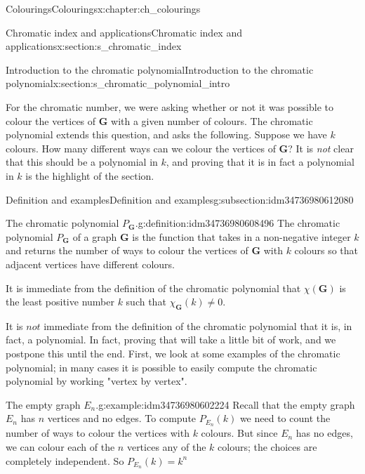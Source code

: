\documentclass[oneside,10pt,]{book}
\numberwithin{equation}{section}
\newcommand{\bfG}{\mathbf{G}}
\begin{document}
\begin{chapterptx}{Colourings}{}{Colourings}{}{}{x:chapter:ch_colourings}
\begin{sectionptx}{Chromatic index and applications}{}{Chromatic index and applications}{}{}{x:section:s_chromatic_index}
\end{sectionptx}
%
%
\typeout{************************************************}
\typeout{************************************************}
%
\begin{sectionptx}{Introduction to the chromatic polynomial}{}{Introduction to the chromatic polynomial}{}{}{x:section:s_chromatic_polynomial_intro}
\begin{introduction}{}%
For the chromatic number, we were asking whether or not it was possible to colour the vertices of \(\bfG\) with a given number of colours.  The chromatic polynomial extends this question, and asks the following.  Suppose we have \(k\) colours.  How many different ways can we colour the vertices of \(\bfG\)?  It is \emph{not} clear that this should be a polynomial in \(k\), and proving that it is in fact a polynomial in \(k\) is the highlight of the section.%
\end{introduction}%
%
%
\typeout{************************************************}
\typeout{************************************************}
%
\begin{subsectionptx}{Definition and examples}{}{Definition and examples}{}{}{g:subsection:idm34736980612080}
\begin{definition}{The chromatic polynomial \(P_{\bfG}\).}{g:definition:idm34736980608496}%
The chromatic polynomial \(P_{\bfG}\) of a graph \(\bfG\) is the function that takes in a non-negative integer \(k\) and returns the number of ways to colour the vertices of \(\bfG\) with \(k\) colours so that adjacent vertices have different colours.%
\end{definition}
It is immediate from the definition of the chromatic polynomial that \(\chi(\bfG)\) is the least positive number \(k\) such that \(\chi_{\bfG}(k)\neq 0\).%
\par
It is \(not\) immediate from the definition of the chromatic polynomial that it is, in fact, a polynomial.  In fact, proving that will take a little bit of work, and we postpone this until the end.  First, we look at some examples of the chromatic polynomial; in many cases it is possible to easily compute the chromatic polynomial by working "vertex by vertex".%
\begin{example}{The empty graph \(E_n\).}{g:example:idm34736980602224}%
Recall that the empty graph \(E_n\) has \(n\) vertices and no edges.  To compute \(P_{E_n}(k)\) we need to count the number of ways to colour the vertices with \(k\) colours.  But since \(E_n\) has no edges, we can colour each of the \(n\) vertices any of the \(k\) colours; the choices are completely independent.  So \(P_{E_n}(k)=k^n\)%

\end{example}
\end{subsectionptx}
\end{sectionptx}
\end{chapterptx}
\end{document}
